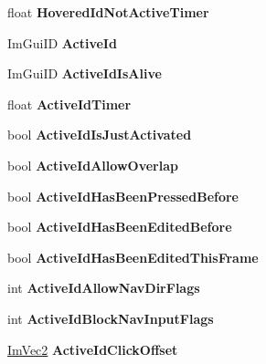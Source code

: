 \begin{DoxyCompactItemize}
float {\bfseries Hovered\+Id\+Not\+Active\+Timer}
\item 
\mbox{\label{structImGuiContext_a11c874eb6cf74ba9162bd1d01c4ccbcc}} 
Im\+Gui\+ID {\bfseries Active\+Id}
\item 
\mbox{\label{structImGuiContext_a91563e660064da31449958c97f70ceb0}} 
Im\+Gui\+ID {\bfseries Active\+Id\+Is\+Alive}
\item 
\mbox{\label{structImGuiContext_a9deb2b22abfb5a4fd306371b19e2b9c4}} 
float {\bfseries Active\+Id\+Timer}
\item 
\mbox{\label{structImGuiContext_aa539096bf2b0ab28e0dbf73d595c64d8}} 
bool {\bfseries Active\+Id\+Is\+Just\+Activated}
\item 
\mbox{\label{structImGuiContext_ab3234556023eabcfed157b79ba4c5869}} 
bool {\bfseries Active\+Id\+Allow\+Overlap}
\item 
\mbox{\label{structImGuiContext_aa2767e20ba942d8e962d02c9cb533a3f}} 
bool {\bfseries Active\+Id\+Has\+Been\+Pressed\+Before}
\item 
\mbox{\label{structImGuiContext_acf057448394a0ecf0ac84e2ea166cfe5}} 
bool {\bfseries Active\+Id\+Has\+Been\+Edited\+Before}
\item 
\mbox{\label{structImGuiContext_ae7b64858c8ca5a15d62173401ca07c50}} 
bool {\bfseries Active\+Id\+Has\+Been\+Edited\+This\+Frame}
\item 
\mbox{\label{structImGuiContext_a27b17ce018cfcd821f29636eba5407b6}} 
int {\bfseries Active\+Id\+Allow\+Nav\+Dir\+Flags}
\item 
\mbox{\label{structImGuiContext_a362630d86794f45554dba02d5d86dd6a}} 
int {\bfseries Active\+Id\+Block\+Nav\+Input\+Flags}
\item 
\mbox{\label{structImGuiContext_a28afb4e9b4ac155825f4b4c94cdc516c}} 
\hyperlink{structImVec2}{Im\+Vec2} {\bfseries Active\+Id\+Click\+Offset}

\end{DoxyCompactItemize}
